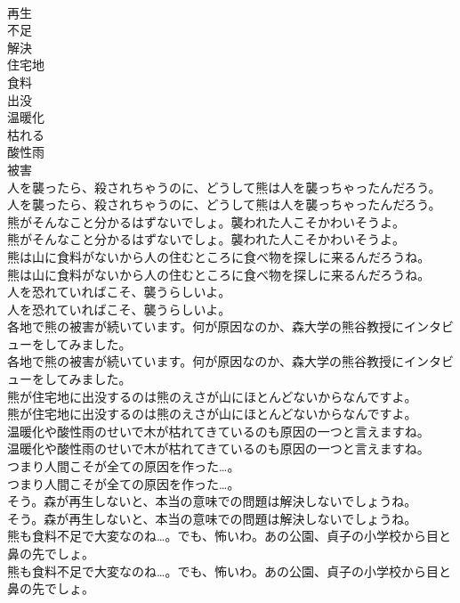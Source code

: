 \documentclass[8pt]{extreport}
\begin{document}
\begin{CJK}{UTF8}{min}
\\	再生
\\	不足
\\	解決
\\	住宅地
\\	食料
\\	出没
\\	温暖化
\\	枯れる
\\	酸性雨
\\	被害
\\	人を襲ったら、殺されちゃうのに、どうして熊は人を襲っちゃったんだろう。	
\\	人を襲ったら、殺されちゃうのに、どうして熊は人を襲っちゃったんだろう。 
\\	熊がそんなこと分かるはずないでしょ。襲われた人こそかわいそうよ。	
\\	熊がそんなこと分かるはずないでしょ。襲われた人こそかわいそうよ。 
\\	熊は山に食料がないから人の住むところに食べ物を探しに来るんだろうね。	
\\	熊は山に食料がないから人の住むところに食べ物を探しに来るんだろうね。 
\\	人を恐れていればこそ、襲うらしいよ。	
\\	人を恐れていればこそ、襲うらしいよ。 
\\	各地で熊の被害が続いています。何が原因なのか、森大学の熊谷教授にインタビューをしてみました。	
\\	各地で熊の被害が続いています。何が原因なのか、森大学の熊谷教授にインタビューをしてみました。 
\\	熊が住宅地に出没するのは熊のえさが山にほとんどないからなんですよ。	
\\	熊が住宅地に出没するのは熊のえさが山にほとんどないからなんですよ。 
\\	温暖化や酸性雨のせいで木が枯れてきているのも原因の一つと言えますね。	
\\	温暖化や酸性雨のせいで木が枯れてきているのも原因の一つと言えますね。 
\\	つまり人間こそが全ての原因を作った…。	
\\	つまり人間こそが全ての原因を作った…。 
\\	そう。森が再生しないと、本当の意味での問題は解決しないでしょうね。	
\\	そう。森が再生しないと、本当の意味での問題は解決しないでしょうね。 
\\	熊も食料不足で大変なのね…。でも、怖いわ。あの公園、貞子の小学校から目と鼻の先でしょ。	
\\	熊も食料不足で大変なのね…。でも、怖いわ。あの公園、貞子の小学校から目と鼻の先でしょ。 

\end{CJK}
\end{document}
